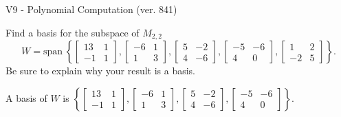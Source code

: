 \begin{exercise}
  \begin{exerciseTitle}V9 - Polynomial Computation (ver. 841)\end{exerciseTitle}
  \begin{exerciseStatement}
    Find a basis for the subspace of \(M_{2,2}\) 
\[W=\mathrm{span}\ \left\{\left[\begin{array}{cc}
13 & 1 \\
-1 & 1
\end{array}\right] , \left[\begin{array}{cc}
-6 & 1 \\
1 & 3
\end{array}\right] , \left[\begin{array}{cc}
5 & -2 \\
4 & -6
\end{array}\right] , \left[\begin{array}{cc}
-5 & -6 \\
4 & 0
\end{array}\right] , \left[\begin{array}{cc}
1 & 2 \\
-2 & 5
\end{array}\right]\right\}.\]
 Be sure to explain why your result is a basis.


  \end{exerciseStatement}
  \begin{exerciseAnswer}
   A basis of \(W\) is  \(\left\{\left[\begin{array}{cc}
13 & 1 \\
-1 & 1
\end{array}\right] , \left[\begin{array}{cc}
-6 & 1 \\
1 & 3
\end{array}\right] , \left[\begin{array}{cc}
5 & -2 \\
4 & -6
\end{array}\right] , \left[\begin{array}{cc}
-5 & -6 \\
4 & 0
\end{array}\right]\right\}\).
  


  \end{exerciseAnswer}
\end{exercise}